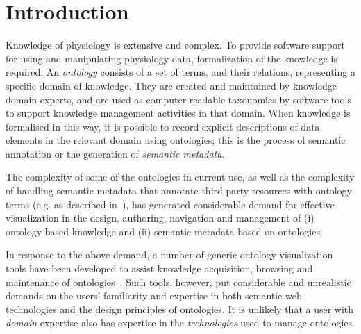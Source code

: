 \section{Introduction}                                                                   %

Knowledge of physiology is extensive and complex. To provide software support for using and manipulating physiology data, formalization of the knowledge is required. An \emph{ontology} consists of a set of terms, and their relations, representing a specific domain of knowledge. They are created and maintained by knowledge domain experts, and are used as computer-readable taxonomies by software tools to support knowledge management activities in that domain.
When knowledge is formalised in this way, it is possible to record explicit descriptions of data elements in the relevant domain using ontologies; this is the process of semantic annotation or the generation of \emph{semantic metadata}.

The complexity of some of the ontologies in current use, as well as the complexity of handling semantic metadata that annotate third party resources with ontology terms (e.g. as described in~\cite{BHW+11}), has generated considerable demand for effective visualization in the design, authoring, navigation and management of (i) ontology-based knowledge and (ii) semantic metadata based on ontologies.

In response to the above demand, a number of generic ontology visualization tools have been developed to assist knowledge acquisition, browsing and maintenance of ontologies~\cite{KHL+07}. Such tools, however, put considerable and unrealistic demands on the users' familiarity and expertise in both semantic web technologies and the design principles of ontologies. It is unlikely that a user with \emph{domain} expertise also has expertise in the \emph{technologies} used to manage ontologies.

